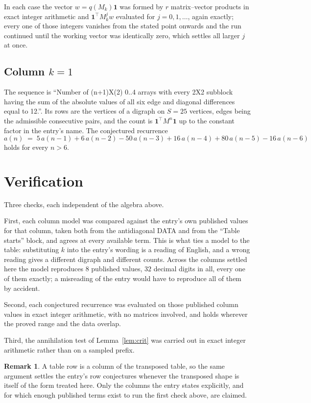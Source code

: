 \documentclass[11pt,a4paper]{article}
\theoremstyle{plain}
\theoremstyle{definition}
\newtheorem{remark}[theorem]{Remark}
\begin{document}
In each case the vector $w=q(M_k)\mathbf{1}$ was formed by $r$ matrix--vector products in
exact integer arithmetic and $\mathbf{1}^{\!\top}M_k^{j}w$ evaluated for $j=0,1,\dots$,
again exactly; every one of those integers vanishes from the stated point onwards and the run
continued until the working vector was identically zero, which settles all larger $j$ at once.

\subsection*{Column $k=1$}
The sequence is ``Number of (n+1)X(2) 0..4 arrays with every 2X2 subblock having the sum of the absolute values of all six edge and diagonal differences equal to 12.''. Its rows are the vertices of a digraph on
$S=25$ vertices, edges being the admissible consecutive pairs, and the count is
$\mathbf{1}^{\!\top}M^{n}\mathbf{1}$ up to the constant factor in the entry's name.
The conjectured recurrence
\[
a(n)\;=\;5\,a(n-1) + 6\,a(n-2) - 50\,a(n-3) + 16\,a(n-4) + 80\,a(n-5) - 16\,a(n-6)
\]
holds for every $n>6$.

\section{Verification}

Three checks, each independent of the algebra above.

First, each column model was compared against the entry's own published values for that
column, taken both from the antidiagonal DATA and from the ``Table starts'' block, and agrees
at every available term. This is what ties a model to the table: substituting $k$ into the
entry's wording is a reading of English, and a wrong reading gives a different digraph and
different counts. Across the columns settled here the model reproduces $8$ published
values, $32$ decimal digits in all, every one of them exactly; a misreading of the entry
would have to reproduce all of them by accident.

Second, each conjectured recurrence was evaluated on those published column values in exact
integer arithmetic, with no matrices involved, and holds wherever the proved range and the
data overlap.

Third, the annihilation test of Lemma~\ref{lem:crit} was carried out in exact integer
arithmetic rather than on a sampled prefix.

\begin{remark}
A table row is a column of the transposed table, so the same argument settles the entry's row
conjectures whenever the transposed shape is itself of the form treated here. Only the columns
the entry states explicitly, and for which enough published terms exist to run the first check
above, are claimed.
\end{remark}
\end{document}
